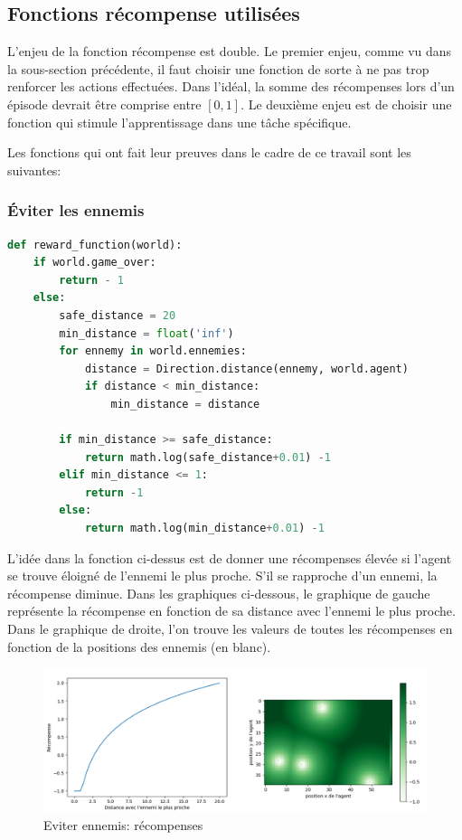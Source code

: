 \documentclass[11pt,a4paper]{report}
\begin{document}
  \subsection{Fonctions récompense utilisées}
  
  \par L'enjeu de la fonction récompense est double. Le premier enjeu, comme vu dans la sous-section précédente, il faut choisir une fonction de sorte à ne pas trop renforcer les actions effectuées. Dans l'idéal, la somme des récompenses lors d'un épisode devrait être comprise entre $[0,1]$. Le deuxième enjeu est de choisir une fonction qui stimule l'apprentissage dans une tâche spécifique. 
  
  \par Les fonctions qui ont fait leur preuves dans le cadre de ce travail sont les suivantes: 
  
  \subsubsection{Éviter les ennemis}

  \begin{lstlisting}[language=python]
  def reward_function(world):
    if world.game_over:
        return - 1
    else:
        safe_distance = 20
        min_distance = float('inf')
        for ennemy in world.ennemies:
            distance = Direction.distance(ennemy, world.agent)
            if distance < min_distance:
                min_distance = distance

        if min_distance >= safe_distance:
            return math.log(safe_distance+0.01) -1
        elif min_distance <= 1:
            return -1
        else:
            return math.log(min_distance+0.01) -1  
   \end{lstlisting}   
      
   \par L'idée dans la fonction ci-dessus est de donner une récompenses élevée si l'agent se trouve éloigné de l'ennemi le plus proche. S'il se rapproche d'un ennemi, la  récompense diminue. Dans les graphiques ci-dessous, le graphique de gauche représente la récompense en fonction de sa distance avec l'ennemi le plus proche. Dans le graphique de droite, l'on trouve les valeurs de toutes les récompenses en fonction de la positions des ennemis (en blanc). 
   
   \begin{figure}[!h]
   \center
   \includegraphics[scale=0.4]{ressources/reward_function_avoid_ennemies.png}
   \caption{Eviter ennemis: récompenses}
   \end{figure} 
   
\end{document}

